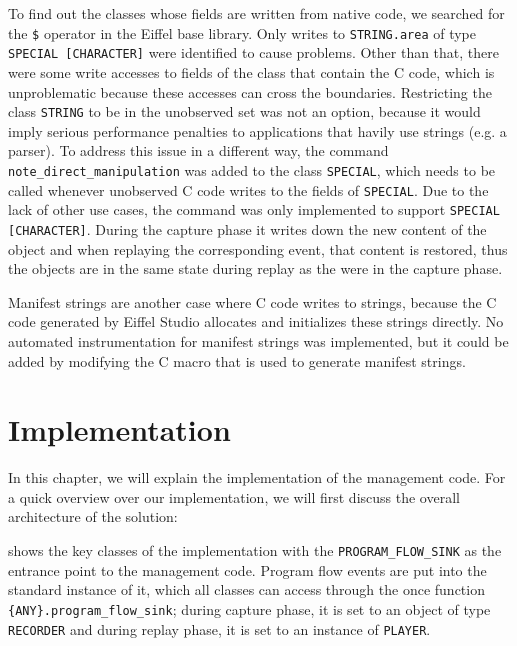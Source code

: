 To find out the classes whose fields are written from native code, we searched for the \texttt{\$} operator in the Eiffel base library. Only writes to \texttt{{STRING}.area} of type \texttt{SPECIAL [CHARACTER]} were identified to cause problems. Other than that, there were some write accesses to fields of the class that contain the C code, which is unproblematic because these accesses can cross the boundaries.
Restricting the class \texttt{STRING} to be in the unobserved set was not an option, because it would imply serious performance penalties to applications that havily use strings (e.g. a parser). To address this issue in a different way, the command \texttt{note\_direct\_manipulation} was added to the class \texttt{SPECIAL}, which needs to be called whenever unobserved C code writes to the fields of \texttt{SPECIAL}. Due to the lack of other use cases, the command was only implemented to support \texttt{SPECIAL [CHARACTER]}. During the capture phase it writes down the new content of the object and when replaying the corresponding event, that content is restored, thus the objects are in the same state during replay as the were in the capture phase.

Manifest strings are another case where C code writes to strings, because the C code generated by Eiffel Studio allocates and initializes these strings directly. No automated instrumentation for manifest strings was implemented, but it could be added by modifying the C macro that is used to generate manifest strings.

\section{Implementation}
In this chapter, we will explain the implementation of the management code. For a quick overview over our implementation, we will first discuss the overall architecture of the solution:

  shows the key classes of the implementation with the \texttt{PROGRAM\_FLOW\_SINK} as the entrance point to the management code. Program flow events are put into the standard instance of it, which all classes can access through the once function \texttt{\{ANY\}.program\_flow\_sink}; during capture phase, it is set to an object of type \texttt{RECORDER} and during replay phase, it is set to an instance of \texttt{PLAYER}.

